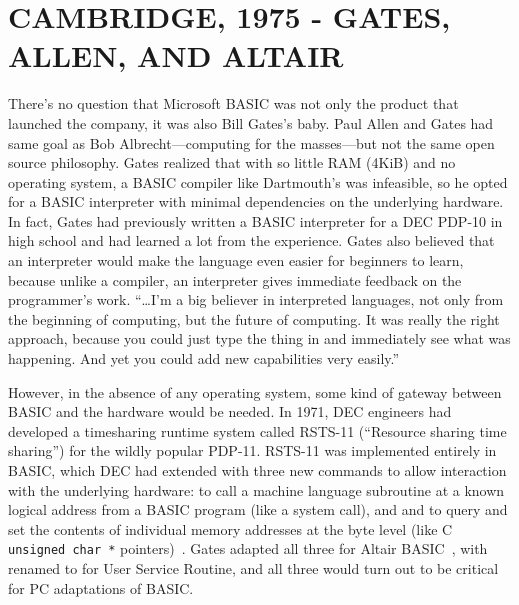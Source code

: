 
\section{CAMBRIDGE, 1975 - GATES, ALLEN, AND ALTAIR}



There's no question that Microsoft BASIC was not only the product that
launched the company, it was also Bill Gates's baby.
Paul Allen and Gates had same goal as Bob Albrecht---computing for the
masses---but not the 
same open source philosophy.  Gates realized that with so little RAM
(4KiB)  and no operating system, a BASIC compiler like Dartmouth's was
infeasible, so he opted for a BASIC interpreter with minimal 
dependencies on the underlying hardware.
In fact, Gates had
previously written a BASIC interpreter for  a DEC PDP-10 in high school and
had learned a lot from the experience.
Gates also believed that an interpreter would make the language even
easier for beginners to learn, because unlike a compiler, 
an interpreter gives immediate feedback on the programmer's work.
``\ldots I'm a big believer in interpreted languages,
not only from the beginning of computing, but the future of
computing. It was really the right approach, because you could just type
the thing in and immediately see what was happening. And yet you could
add new capabilities very easily.'' ~\cite{smithsonian_interview}

However, in the absence of any operating system, some kind of gateway
between BASIC and the hardware would be needed.  
In 1971, DEC engineers had developed a timesharing runtime system called
RSTS-11 (``Resource sharing time sharing'') for the wildly popular
PDP-11.
RSTS-11 was implemented entirely in BASIC, 
which DEC had
extended with three new commands to allow interaction with the underlying
hardware:  to call a machine language subroutine at a known
logical address from a BASIC
program (like a system call), and 
 and  to query and set the contents of individual memory
addresses at the byte level (like C \texttt{unsigned char~*}
pointers)~\cite[pp.~204--205]{ceruzzi}. 
Gates adapted all three for Altair
BASIC~\cite{smithsonian_interview}, with  
renamed to  for User Service Routine, and
all three would turn out to be critical for PC adaptations of 
BASIC. 

